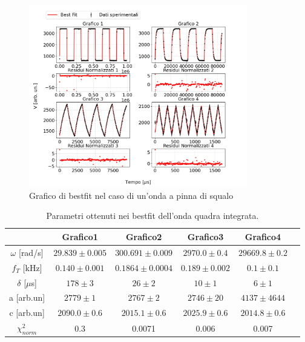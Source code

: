\documentclass{article}
\begin{document}
                \begin{figure}[H]
                    \centering
                    \includegraphics[width=0.85\textwidth]{bestfit_sharkfins.png} %
                    \caption{Grafico di bestfit nel caso di un'onda a pinna di squalo
                    }
                    \label{fig:bestfit_shark.fig}
                \end{figure}     

                \begin{table}[H]
                    \centering
                    \begin{tabular}{cccccc}
                        \hline
                         & Grafico1 & Grafico2 & Grafico3 & Grafico4 \\
                        \hline
                        $\omega$ [rad/s]    & $29.839 \pm 0.005$      & $300.691\pm 0.009$    & $2970.0 \pm 0.4$      & $29669.8\pm 0.2$ \\
                        $f_T$ [kHz]         & $0.140 \pm 0.001$         & $0.1864 \pm 0.0004$   & $0.189 \pm 0.002$     & $0.1 \pm 0.1$ \\
                        $\delta$ [$\mu$s]   & $178 \pm 3$               & $26 \pm 2$            & $10\pm 1$             & $6 \pm 1$ \\
                        a [arb.un]          & $2779\pm 1$               & $2767 \pm 2$          & $2746\pm 20$          & $4137\pm 4644$ \\
                        c [arb.un]          & $2090.0 \pm 0.6 $         &$2015.1\pm 0.6$        & $2025.9 \pm 0.6$      & $2014.8 \pm 0.6$ \\
                        $\chi^{2}_{norm}$   & 0.3                       &0.0071                 & 0.006                 & 0.007\\
                        \hline
                    \end{tabular}
                    \caption{Parametri ottenuti nei bestfit dell'onda quadra integrata.}
                    \label{tab:bestfit_params}
                \end{table}
\end{document}
